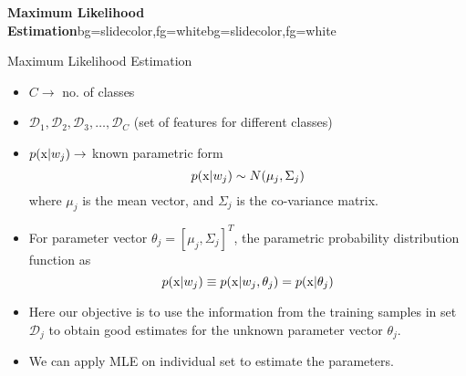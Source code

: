 \begin{frame}{}
\begin{variableblock}{\centering \Large \textbf{\vspace{4pt}\newline Maximum Likelihood Estimation\vspace{4pt}}}{bg=slidecolor,fg=white}{bg=slidecolor,fg=white}
\end{variableblock}
\end{frame}

\begin{frame}{Maximum Likelihood Estimation}
\begin{itemize}
\item $C\rightarrow$ no. of classes
\item $\mathcal{D}_1,\mathcal{D}_2,\mathcal{D}_3,\ldots,\mathcal{D}_C$ (set of features for different classes)
\item $p({\rm x}|w_j)\rightarrow$ known parametric form
\begin{equation}
p({\rm x}|w_j)\sim N(\mu_j,\Sigma_j)\nonumber
\end{equation}
where $\mu_j$ is the mean vector, and $\Sigma_j$ is the co-variance matrix.
\item For parameter vector $\theta_j = \left[\mu_j,
\Sigma_j\right]^T$, the {\color{mycolor1}parametric probability distribution function} as
\begin{equation}
p({\rm x}|w_j)\equiv p({\rm x}|w_j,\theta_j)=p({\rm x}|\theta_j)\nonumber
\end{equation}
\item Here our objective is to use the information from the training samples in set $\mathcal{D}_j$ to obtain good estimates for the unknown parameter vector $\theta_j$.
\item We can apply MLE on individual set to estimate the parameters.
\end{itemize}
\end{frame}

